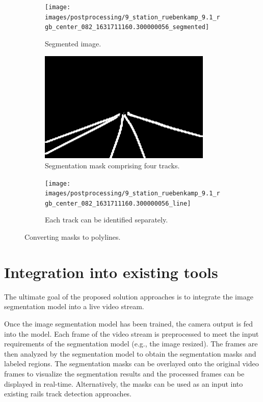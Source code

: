 \documentclass[Master,MDS,english]{BASE/twbook} %
\begin{document}
\begin{figure}
\centering
\begin{subfigure}[t]{.33\textwidth}
  \centering
  \texttt{[image: images/postprocessing/9\_station\_ruebenkamp\_9.1\_rgb\_center\_082\_1631711160.300000056\_segmented]}
  \caption{Segmented image.}
\end{subfigure}%
\begin{subfigure}[t]{.33\textwidth}
  \centering
  \includegraphics[width=0.9\textwidth]{images/postprocessing/9_station_ruebenkamp_9.1_rgb_center_082_1631711160.300000056_mask}
  \caption{Segmentation mask comprising four tracks.}
\end{subfigure}%
\begin{subfigure}[t]{.33\textwidth}
  \centering
  \texttt{[image: images/postprocessing/9\_station\_ruebenkamp\_9.1\_rgb\_center\_082\_1631711160.300000056\_line]}
  \caption{Each track can be identified separately. }
\end{subfigure}
\caption{Converting masks to polylines. }
\label{fig:postprocessing1}
\end{figure}




\section{Integration into existing tools}

The ultimate goal of the proposed solution approaches is to integrate the image segmentation model into a live video stream.

Once the image segmentation model has been trained, the camera output is fed into the model. Each frame of the video stream is preprocessed to meet the input requirements of the segmentation model (e.g., the image resized). The frames are then analyzed by the segmentation model to obtain the segmentation masks and labeled regions. 
The segmentation masks can be overlayed onto the original video frames to visualize the segmentation results and the processed frames can be displayed in real-time. Alternatively, the masks can be used as an input into existing rails track detection approaches.
\end{document}

